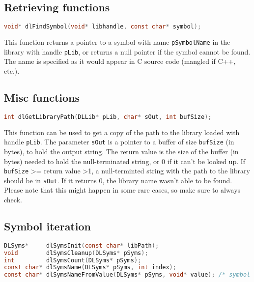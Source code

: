 \subsection{Retrieving functions}

\begin{lstlisting}[language=c]
void* dlFindSymbol(void* libhandle, const char* symbol);
\end{lstlisting}

This function returns a pointer to a symbol with name \lstinline{pSymbolName} in the
library with handle \lstinline{pLib}, or returns a null pointer if the symbol cannot
be found. The name is specified as it would appear in C source code (mangled if C++, etc.).

\subsection{Misc functions}
\begin{lstlisting}[language=c]
int dlGetLibraryPath(DLLib* pLib, char* sOut, int bufSize);
\end{lstlisting}

This function can be used to get a copy of the path to the library loaded with handle
\lstinline{pLib}. The parameter \lstinline{sOut} is a pointer to a buffer of size
\lstinline{bufSize} (in bytes), to hold the output string. The return value is the size
of the buffer (in bytes) needed to hold the null-terminated string, or 0 if it can't be
looked up. If \lstinline{bufSize} \textgreater= return value \textgreater 1, a null-terminted string with the
path to the library should be in \lstinline{sOut}.  If it returns 0, the library name wasn't
able to be found. Please note that this might happen in some rare cases, so make sure to always check.

\subsection{Symbol iteration}

\begin{lstlisting}[language=c]
DLSyms*     dlSymsInit(const char* libPath);
void        dlSymsCleanup(DLSyms* pSyms);
int         dlSymsCount(DLSyms* pSyms);
const char* dlSymsName(DLSyms* pSyms, int index);
const char* dlSymsNameFromValue(DLSyms* pSyms, void* value); /* symbol must be loaded */
\end{lstlisting}


